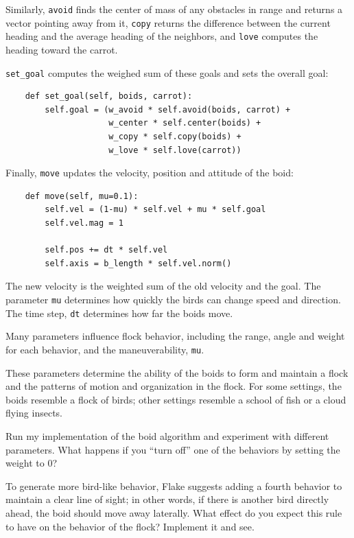 \documentclass[10pt]{book}
\begin{document}
Similarly, {\tt avoid} finds the center of mass of any obstacles
in range and returns a vector pointing away from it,
{\tt copy} returns the difference between the current heading
and the average heading of the neighbors, and {\tt love}
computes the heading toward the carrot.

\verb"set_goal" computes the weighed sum of these goals and
sets the overall goal:

\begin{verbatim}
    def set_goal(self, boids, carrot):
        self.goal = (w_avoid * self.avoid(boids, carrot) +
                     w_center * self.center(boids) +
                     w_copy * self.copy(boids) +
                     w_love * self.love(carrot))
\end{verbatim}

Finally, {\tt move} updates the velocity, position and
attitude of the boid:

\begin{verbatim}
    def move(self, mu=0.1):
        self.vel = (1-mu) * self.vel + mu * self.goal
        self.vel.mag = 1

        self.pos += dt * self.vel
        self.axis = b_length * self.vel.norm()
\end{verbatim}

The new velocity is the weighted sum of the old velocity
and the goal.  The parameter {\tt mu} determines how quickly
the birds can change speed and direction.  The time step, {\tt dt}
determines how far the boids move.

Many parameters influence flock behavior, including the range, angle
and weight for each behavior, and the maneuverability, {\tt mu}.

These parameters determine the ability of the boids to form and
maintain a flock and the patterns of motion and organization in the
flock.  For some settings, the boids resemble a flock of birds; other
settings resemble a school of fish or a cloud flying insects.

\begin{exercise}


Run my implementation of the boid algorithm and experiment with
different parameters.  What happens if you ``turn off'' one
of the behaviors by setting the weight to 0?

To generate more bird-like behavior, Flake suggests adding a fourth
behavior to maintain a clear line of sight; in other words, if there
is another bird directly ahead, the boid should move away
laterally.  What effect do you expect this rule to have on the
behavior of the flock?  Implement it and see.

\end{exercise}
\end{document}
